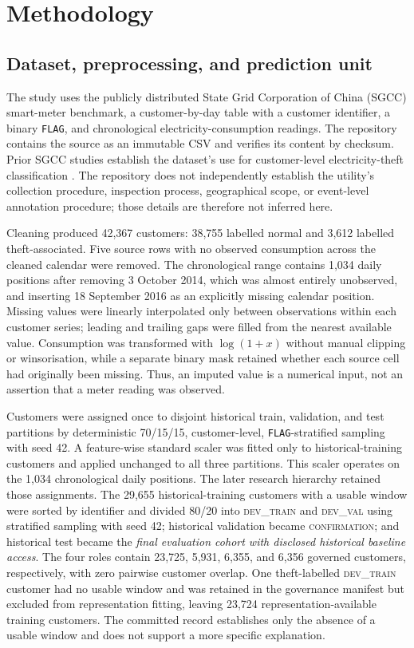 \section{Methodology}\label{sec:methodology}

\subsection{Dataset, preprocessing, and prediction unit}

The study uses the publicly distributed State Grid Corporation of China (SGCC) smart-meter benchmark, a customer-by-day table with a customer identifier, a binary \texttt{FLAG}, and chronological electricity-consumption readings. The repository contains the source as an immutable CSV and verifies its content by checksum. Prior SGCC studies establish the dataset's use for customer-level electricity-theft classification \cite{Zheng2018WideDeep,Shehzad2022GeneticETD}. The repository does not independently establish the utility's collection procedure, inspection process, geographical scope, or event-level annotation procedure; those details are therefore not inferred here.

Cleaning produced 42,367 customers: 38,755 labelled normal and 3,612 labelled theft-associated. Five source rows with no observed consumption across the cleaned calendar were removed. The chronological range contains 1,034 daily positions after removing 3 October 2014, which was almost entirely unobserved, and inserting 18 September 2016 as an explicitly missing calendar position. Missing values were linearly interpolated only between observations within each customer series; leading and trailing gaps were filled from the nearest available value. Consumption was transformed with $\log(1+x)$ without manual clipping or winsorisation, while a separate binary mask retained whether each source cell had originally been missing. Thus, an imputed value is a numerical input, not an assertion that a meter reading was observed.

Customers were assigned once to disjoint historical train, validation, and test partitions by deterministic 70/15/15, customer-level, \texttt{FLAG}-stratified sampling with seed 42. A feature-wise standard scaler was fitted only to historical-training customers and applied unchanged to all three partitions. This scaler operates on the 1,034 chronological daily positions. The later research hierarchy retained those assignments. The 29,655 historical-training customers with a usable window were sorted by identifier and divided 80/20 into \textsc{dev\_train} and \textsc{dev\_val} using stratified sampling with seed 42; historical validation became \textsc{confirmation}; and historical test became the \emph{final evaluation cohort with disclosed historical baseline access}. The four roles contain 23,725, 5,931, 6,355, and 6,356 governed customers, respectively, with zero pairwise customer overlap. One theft-labelled \textsc{dev\_train} customer had no usable window and was retained in the governance manifest but excluded from representation fitting, leaving 23,724 representation-available training customers. The committed record establishes only the absence of a usable window and does not support a more specific explanation.

